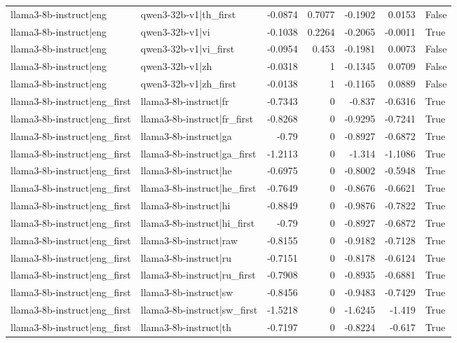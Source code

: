 \begin{table}
\begin{tabular}{l l r r r r l}
llama3-8b-instruct|eng & qwen3-32b-v1|th_first & -0.0874 & 0.7077 & -0.1902 & 0.0153 & False \\
llama3-8b-instruct|eng & qwen3-32b-v1|vi & -0.1038 & 0.2264 & -0.2065 & -0.0011 & True \\
llama3-8b-instruct|eng & qwen3-32b-v1|vi_first & -0.0954 & 0.453 & -0.1981 & 0.0073 & False \\
llama3-8b-instruct|eng & qwen3-32b-v1|zh & -0.0318 & 1 & -0.1345 & 0.0709 & False \\
llama3-8b-instruct|eng & qwen3-32b-v1|zh_first & -0.0138 & 1 & -0.1165 & 0.0889 & False \\
llama3-8b-instruct|eng_first & llama3-8b-instruct|fr & -0.7343 & 0 & -0.837 & -0.6316 & True \\
llama3-8b-instruct|eng_first & llama3-8b-instruct|fr_first & -0.8268 & 0 & -0.9295 & -0.7241 & True \\
llama3-8b-instruct|eng_first & llama3-8b-instruct|ga & -0.79 & 0 & -0.8927 & -0.6872 & True \\
llama3-8b-instruct|eng_first & llama3-8b-instruct|ga_first & -1.2113 & 0 & -1.314 & -1.1086 & True \\
llama3-8b-instruct|eng_first & llama3-8b-instruct|he & -0.6975 & 0 & -0.8002 & -0.5948 & True \\
llama3-8b-instruct|eng_first & llama3-8b-instruct|he_first & -0.7649 & 0 & -0.8676 & -0.6621 & True \\
llama3-8b-instruct|eng_first & llama3-8b-instruct|hi & -0.8849 & 0 & -0.9876 & -0.7822 & True \\
llama3-8b-instruct|eng_first & llama3-8b-instruct|hi_first & -0.79 & 0 & -0.8927 & -0.6872 & True \\
llama3-8b-instruct|eng_first & llama3-8b-instruct|raw & -0.8155 & 0 & -0.9182 & -0.7128 & True \\
llama3-8b-instruct|eng_first & llama3-8b-instruct|ru & -0.7151 & 0 & -0.8178 & -0.6124 & True \\
llama3-8b-instruct|eng_first & llama3-8b-instruct|ru_first & -0.7908 & 0 & -0.8935 & -0.6881 & True \\
llama3-8b-instruct|eng_first & llama3-8b-instruct|sw & -0.8456 & 0 & -0.9483 & -0.7429 & True \\
llama3-8b-instruct|eng_first & llama3-8b-instruct|sw_first & -1.5218 & 0 & -1.6245 & -1.419 & True \\
llama3-8b-instruct|eng_first & llama3-8b-instruct|th & -0.7197 & 0 & -0.8224 & -0.617 & True \\

\end{tabular}
\end{table}

